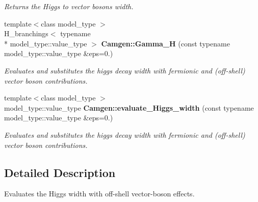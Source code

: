 \begin{DoxyCompactItemize}
\begin{DoxyCompactList}\small\item\em Returns the Higgs to vector bosons width. \end{DoxyCompactList}\item 
{\footnotesize template$<$class model\-\_\-type $>$ }\\H\-\_\-branchings$<$ typename \\*
model\-\_\-type\-::value\-\_\-type $>$ {\bfseries Camgen\-::\-Gamma\-\_\-\-H} (const typename model\-\_\-type\-::value\-\_\-type \&eps=0.)
\begin{DoxyCompactList}\small\item\em Evaluates and substitutes the higgs decay width with fermionic and (off-\/shell) vector boson contributions. \end{DoxyCompactList}\item 
{\footnotesize template$<$class model\-\_\-type $>$ }\\model\-\_\-type\-::value\-\_\-type {\bfseries Camgen\-::evaluate\-\_\-\-Higgs\-\_\-width} (const typename model\-\_\-type\-::value\-\_\-type \&eps=0.)
\begin{DoxyCompactList}\small\item\em Evaluates and substitutes the higgs decay width with fermionic and (off-\/shell) vector boson contributions. \end{DoxyCompactList}\end{DoxyCompactItemize}


\subsection{Detailed Description}
Evaluates the Higgs width with off-\/shell vector-\/boson effects. 